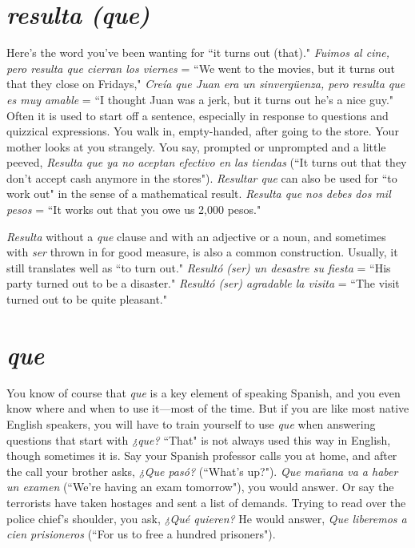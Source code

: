 \section{\emph{resulta (que)}}

Here's the word you've been wanting for ``it turns out (that)."
\emph{Fuimos al cine, pero resulta que cierran los viernes} = ``We went to
the movies, but it turns out that they close on Fridays," \emph{Creía que
Juan era un sinvergüenza, pero resulta que es muy amable} = ``I
thought Juan was a jerk, but it turns out he's a nice guy." Often it is
used to start off a sentence, especially in response to questions and
quizzical expressions. You walk in, empty-handed, after going to the
store. Your mother looks at you strangely. You say, prompted or unprompted and a little peeved, \emph{Resulta que ya no aceptan efectivo en
las tiendas} (``It turns out that they don't accept cash anymore in the
stores"). \emph{Resultar que} can also be used for ``to work out" in the sense
of a mathematical result. \emph{Resulta que nos debes dos mil pesos} = ``It
works out that you owe us 2,000 pesos."

\emph{Resulta} without a \emph{que} clause and with an adjective or a noun,
and sometimes with \emph{ser} thrown in for good measure, is also a common
construction. Usually, it still translates well as ``to turn out." \emph{Resultó
(ser) un desastre su fiesta} = ``His party turned out to be a disaster."
\emph{Resultó (ser) agradable la visita} = ``The visit turned out to be quite
pleasant."

\section{\emph{que}}

You know of course that \emph{que} is a key element of speaking
Spanish, and you even know where and when to use it---most of the
time. But if you are like most native English speakers, you will have
to train yourself to use \emph{que} when answering questions that start with
\emph{¿que?} ``That" is not always used this way in English, though sometimes it is. Say your Spanish professor calls you at home, and after the
call your brother asks, \emph{¿Que pasó?} (``What's up?"). \emph{Que mañana va a
haber un examen} (``We're having an exam tomorrow"), you would answer. Or say the terrorists have taken hostages and sent a list of demands. Trying to read over the police chief's shoulder, you ask, \emph{¿Qué
quieren?} He would answer, \emph{Que liberemos a cien prisioneros} (``For us
to free a hundred prisoners").

